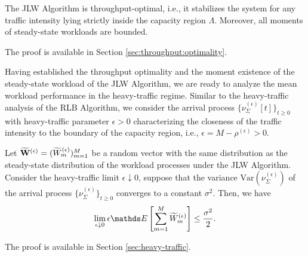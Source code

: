 \documentclass[10pt, conference, letterpaper]{IEEEtran} %
\begin{document}
\begin{proposition}
\label{prop:JLW:throughput}
The JLW Algorithm is throughput-optimal, i.e., it stabilizes the system for any traffic intensity lying strictly inside the capacity region $\Lambda$. Moreover, all moments of steady-state workloads are bounded.
\end{proposition}
\begin{IEEEproof}
The proof is available in Section \ref{sec:throughput:optimality}.
\end{IEEEproof}

Having established the throughput optimality and the moment existence of the steady-state workload of the JLW Algorithm, we are ready to analyze the mean workload performance in the heavy-traffic regime. Similar to the heavy-traffic analysis of the RLB Algorithm, we consider the arrival process $\{\nu_{\Sigma}^{(\epsilon)}[t]\}_{t\geq0}$ with heavy-traffic parameter $\epsilon>0$ characterizing the closeness of the traffic intensity to the boundary of the capacity region, i.e., $\epsilon=M-\rho^{(\epsilon)}>0$.




\begin{proposition}
\label{prop:JLW:upperBound}
Let $\widetilde{\mathbf{W}}^{(\epsilon)}=(\widetilde{W}_m^{(\epsilon)})_{m=1}^{M}$ be a random vector with the same distribution as the steady-state distribution of the workload processes under the JLW Algorithm. Consider the heavy-traffic limit $\epsilon\downarrow0$, suppose that the variance $\text{Var}(\nu_{\Sigma}^{(\epsilon)})$ of the arrival process $\{\nu_{\Sigma}^{(\epsilon)}\}_{t\geq0}$ converges to a constant $\sigma^2$. Then, we have 
\begin{align}
\label{eqn:prop:JLW:upperBound}
\lim_{\epsilon\downarrow0}\epsilon\bE\left[\sum_{m=1}^{M}\wt{W}_m^{(\epsilon)}\right]\leq\frac{\sigma^2}{2}.
\end{align}
\end{proposition}
\begin{IEEEproof}
The proof is available in Section \ref{sec:heavy-traffic}.
\end{IEEEproof}
\end{document}
